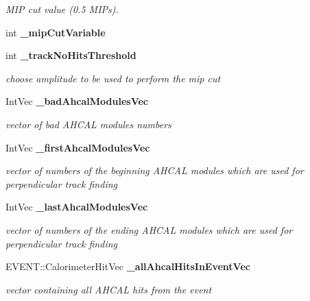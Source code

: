 \begin{DoxyCompactItemize}
\begin{DoxyCompactList}\small\item\em MIP cut value (0.5 MIPs). \item\end{DoxyCompactList}\item 
int {\bfseries \_\-mipCutVariable}\label{classCALICE_1_1MipTrackFinder_a19e45f827fa9c2b8f52ab7dc42fffd96}

\item 
int {\bf \_\-trackNoHitsThreshold}
\begin{DoxyCompactList}\small\item\em choose amplitude to be used to perform the mip cut \item\end{DoxyCompactList}\item 
IntVec {\bf \_\-badAhcalModulesVec}\label{classCALICE_1_1MipTrackFinder_acd8b079f861742d25cc2fcfc6ccfb763}

\begin{DoxyCompactList}\small\item\em vector of bad AHCAL modules numbers \item\end{DoxyCompactList}\item 
IntVec {\bf \_\-firstAhcalModulesVec}\label{classCALICE_1_1MipTrackFinder_adc6d58d6ee59a8530f1a6439bd02ae3d}

\begin{DoxyCompactList}\small\item\em vector of numbers of the beginning AHCAL modules which are used for perpendicular track finding \item\end{DoxyCompactList}\item 
IntVec {\bf \_\-lastAhcalModulesVec}\label{classCALICE_1_1MipTrackFinder_a08397bf4269e486cc906a645b26f5a7c}

\begin{DoxyCompactList}\small\item\em vector of numbers of the ending AHCAL modules which are used for perpendicular track finding \item\end{DoxyCompactList}\item 
EVENT::CalorimeterHitVec {\bf \_\-allAhcalHitsInEventVec}\label{classCALICE_1_1MipTrackFinder_a4c48ff185ec8093624934b9c023d2057}

\begin{DoxyCompactList}\small\item\em vector containing all AHCAL hits from the event \item\end{DoxyCompactList}\end{DoxyCompactItemize}


